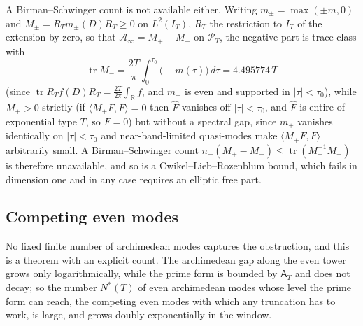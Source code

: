 \documentclass[11pt]{amsart}
\theoremstyle{definition}
\theoremstyle{remark}
\newcommand{\R}{\mathbb R}
\newcommand{\PT}{\mathcal P_T}
\newcommand{\IT}{I_T}
\newcommand{\Fh}{\widehat F}
\newcommand{\Aconst}{\mathsf A_T}
\newcommand{\Ainf}{\mathcal A_\infty}
\begin{document}
A Birman--Schwinger count is not available either. Writing $m_\pm=\max(\pm m,0)$ and
$M_\pm=R_Tm_\pm(D)R_T\ge0$ on $L^2(\IT)$, $R_T$ the restriction to $\IT$ of the extension by zero,
so that $\Ainf=M_+-M_-$ on $\PT$, the negative part is trace class with
\[
\operatorname{tr}M_-=\frac{2T}{\pi}\int_0^{\tau_0}\big(-m(\tau)\big)\,d\tau=4.495774\,T
\]
(since $\operatorname{tr}R_Tf(D)R_T=\frac{2T}{2\pi}\int_\R f$, and $m_-$ is even and supported in
$|\tau|<\tau_0$), while $M_+>0$ strictly (if $\langle M_+F,F\rangle=0$ then $\Fh$ vanishes off
$|\tau|<\tau_0$, and $\Fh$ is entire of exponential type $T$, so $F=0$) but without a spectral gap,
since $m_+$ vanishes identically on $|\tau|<\tau_0$ and near-band-limited quasi-modes make
$\langle M_+F,F\rangle$ arbitrarily small. A Birman--Schwinger count
$n_-(M_+-M_-)\le\operatorname{tr}(M_+^{-1}M_-)$ is therefore unavailable, and so is a
Cwikel--Lieb--Rozenblum bound, which fails in dimension one and in any case requires an elliptic
free part.

\subsection{Competing even modes}\label{subsec:arena}

No fixed finite number of archimedean modes captures the obstruction, and this is a theorem with an
explicit count. The archimedean gap along the even tower grows only logarithmically, while the prime
form is bounded by $\Aconst$ and does not decay; so the number $N^*(T)$ of even archimedean modes
whose level the prime form can reach, the competing even modes with which any truncation has to
work, is large, and grows doubly exponentially in the window.
\end{document}
